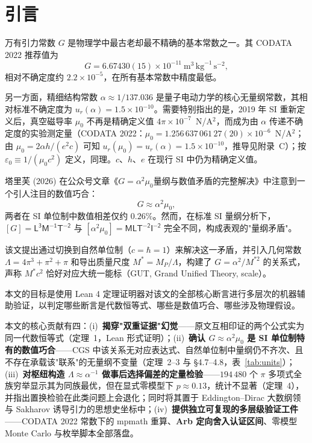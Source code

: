 \documentclass[12pt,a4paper]{article}
\begin{document}
\tableofcontents
\newpage

\section{引言}

万有引力常数 $G$ 是物理学中最古老却最不精确的基本常数之一。其 CODATA 2022 推荐值为
\begin{equation}
  G = 6.67430(15)\times10^{-11}~\text{m}^3\,\text{kg}^{-1}\,\text{s}^{-2},
\end{equation}
相对不确定度约 $2.2\times10^{-5}$，在所有基本常数中精度最低。

另一方面，精细结构常数 $\alpha \approx 1/137.036$ 是量子电动力学的核心无量纲常数，其相对标准不确定度为 $u_r(\alpha) = 1.5\times10^{-10}$。需要特别指出的是，2019 年 SI 重新定义后，真空磁导率 $\mu_0$ 不再是精确定义值 $4\pi\times10^{-7}$~N/A$^2$，而成为由 $\alpha$ 传递不确定度的实验测定量（CODATA 2022：$\mu_0 = 1.256\,637\,061\,27(20)\times10^{-6}$~N/A$^2$；由 $\mu_0 = 2\alpha h/(e^2 c)$ 可知 $u_r(\mu_0) = u_r(\alpha) = 1.5\times10^{-10}$，推导见附录~C）；按 $\varepsilon_0 \equiv 1/(\mu_0 c^2)$ 定义，同理。$c$、$h$、$e$ 在现行 SI 中仍为精确定义值。

塔里芙 (2026) 在公众号文章《$G=\alpha^2\mu_0$量纲与数值矛盾的完整解决》\cite{talihua2026}中注意到一个引人注目的数值巧合：
\begin{equation}\label{eq:main}
  G \approx \alpha^2 \mu_0,
\end{equation}
两者在 SI 单位制中数值相差仅约 $0.26\%$。然而，在标准 SI 量纲分析下，$[G] = \mathsf{L^3 M^{-1} T^{-2}}$ 与 $[\alpha^2\mu_0] = \mathsf{M L T^{-2} I^{-2}}$ 完全不同，构成表观的"量纲矛盾"。

该文提出通过切换到自然单位制（$c = \hbar = 1$）来解决这一矛盾，并引入几何常数 $\Lambda = 4\pi^3+\pi^2+\pi$ 和导出质量尺度 $M^* = M_P/\Lambda$，构建了 $G = \alpha^2/M^{*2}$ 的关系式，声称 $M^*c^2$ 恰好对应大统一能标（GUT, Grand Unified Theory, scale）。

本文的目标是使用 Lean 4 定理证明器\cite{lean4}对该文的全部核心断言进行多层次的机器辅助验证，以判定哪些断言是代数恒等式、哪些是数值巧合、哪些涉及物理假设。

本文的核心贡献有四：(i)~\textbf{揭穿"双重证据"幻觉}——原文互相印证的两个公式实为同一代数恒等式（定理~1，Lean 形式证明）；(ii)~\textbf{确认 $G \approx \alpha^2\mu_0$ 是 SI 单位制特有的数值巧合}——CGS 中该关系无对应表达式、自然单位制中量纲仍不齐次、且不存在承载该"联系"的无量纲不变量（定理~2--3 与 §4.7--4.8，表~\ref{tab:units}）；(iii)~\textbf{对枢纽构造 $\Lambda \approx \alpha^{-1}$ 做事后选择偏差的定量检验}——$194\,480$ 个 $\pi$ 多项式全族穷举显示其为同族最优，但在显式零模型下 $p \approx 0.13$，统计不显著（定理~4），并指出置换检验在此类问题上会退化；同时将其置于 Eddington--Dirac 大数纲领\cite{eddington1936,dirac1937}与 Sakharov 诱导引力\cite{sakharov1967}的思想史坐标中；(iv)~\textbf{提供独立可复现的多层级验证工件}——CODATA 2022 常数下的 mpmath 重算、\textbf{Arb 定向舍入认证区间}\cite{johansson2017}、零模型 Monte Carlo 与枚举脚本全部落盘。
\end{document}
